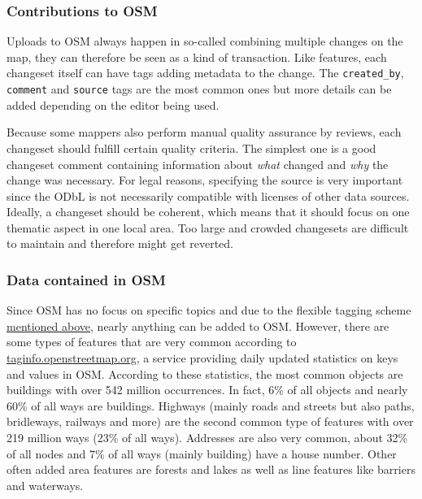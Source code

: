 		\subsubsection{Contributions to OSM}
		
			Uploads to OSM always happen in so-called  combining multiple changes on the map\cite{osm-wiki-changeset}, they can therefore be seen as a kind of transaction.
			Like features, each changeset itself can have tags adding metadata to the change.
			The \texttt{created\_by}, \texttt{comment} and \texttt{source} tags are the most common ones but more details can be added depending on the editor being used.
			
			Because some mappers also perform manual quality assurance by reviews, each changeset should fulfill certain quality criteria.
			The simplest one is a good changeset comment containing information about \textit{what} changed and \textit{why} the change was necessary.
			For legal reasons, specifying the source is very important since the ODbL is not necessarily compatible with licenses of other data sources.
			Ideally, a changeset should be coherent, which means that it should focus on one thematic aspect in one local area.
			Too large and crowded changesets are difficult to maintain and therefore might get reverted.
			
		\subsubsection{Data contained in OSM}
		
			Since OSM has no focus on specific topics and due to the flexible tagging scheme \hyperref[subsubsec:osm-attributes]{mentioned above}, nearly anything can be added to OSM.
			However, there are some types of features that are very common according to \href{https://taginfo.openstreetmap.org/keys}{taginfo.openstreetmap.org}, a service providing daily updated statistics on keys and values in OSM\cite{taginfo-keys}.
			According to these statistics, the most common objects are buildings with over 542 million occurrences.
			In fact, 6\% of all objects and nearly 60\% of all ways are buildings.
			Highways (mainly roads and streets but also paths, bridleways, railways and more) are the second common type of features with over 219 million ways (23\% of all ways).
			Addresses are also very common, about 32\% of all nodes and 7\% of all ways (mainly building) have a house number.
			Other often added area features are forests and lakes as well as line features like barriers and waterways.
			
